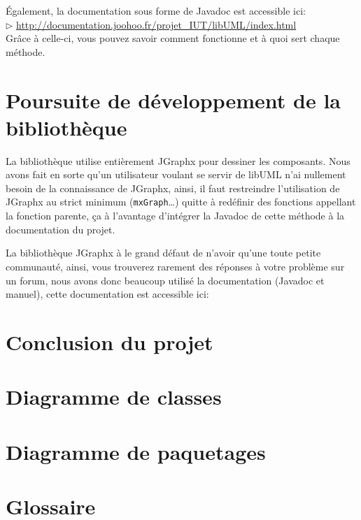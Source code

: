 \documentclass[12pt,a4paper,openany]{report}
\begin{document}
		Également, la documentation sous forme de Javadoc est accessible ici:\\
	$\rhd$ \url{http://documentation.joohoo.fr/projet\_IUT/libUML/index.html}\\
	Grâce à celle-ci, vous pouvez savoir comment fonctionne et à quoi sert chaque méthode.

	\chapter{Poursuite de développement de la bibliothèque}				
	La bibliothèque utilise entièrement JGraphx pour dessiner les composants. Nous avons fait en sorte qu'un utilisateur voulant se servir de libUML
	n'ai nullement besoin de la connaissance de JGraphx, ainsi, il faut restreindre l'utilisation de JGraphx au strict minimum (\texttt{mxGraph}\ldots) quitte
	à redéfinir des fonctions appellant la fonction parente, ça à l'avantage d'intégrer la Javadoc de cette méthode à la documentation du projet.

	La bibliothèque JGraphx à le grand défaut de n'avoir qu'une toute petite communauté, ainsi, vous trouverez rarement des réponses à votre problème
	sur un forum, nous avons donc beaucoup utilisé la documentation (Javadoc et manuel), cette documentation est accessible ici: 
	
	\chapter{Conclusion du projet}
	
	\closeout\glossaireVar
	\appendix
	\chapter{Diagramme de classes}
	\chapter{Diagramme de paquetages}
	\chapter{Glossaire}
	\begin{sortedlist}
		
	\end{sortedlist}
\end{document}
